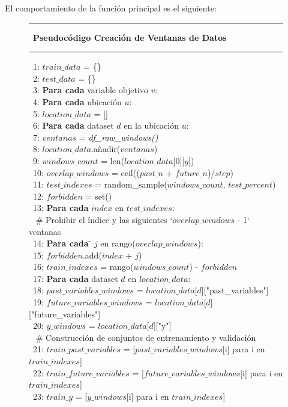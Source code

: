 \bigskip
El comportamiento de la función principal es el siguiente:

\begin{figure}[H]
{\small
 \hrule \
 {\bf\small Pseudocódigo Creación de Ventanas de Datos}
 \hrule
\begin{center}
\begin{tabbing}
\ 1: $train\_data$ = \{\} \\
\ 2: $test\_data$ = \{\} \\
\ 3: {\bf Par}\={\bf a cada} variable objetivo $v$: \\
\ 4: \> {\bf Par}\={\bf a cada} ubicación $u$:  \\
\ 5: \> $location\_data$ = [] \\
\ 6: \> \> {\bf Par}\={\bf a cada} dataset $d$ en la ubicación $u$:  \\
\ 7: \> \> \> $ventanas$ =  \textit{df\_raw\_windows()} \\
\ 8: \> \> \> $location\_data$.añadir($ventanas$) \\
\ 9: \> \> $windows\_count$ = len($location\_data$[0][$y$]) \\
\ 10: \> \> $overlap\_windows$ = ceil(($past\_n$ + $future\_n$)/$step$) \\
\ 11: \> \> $test\_indexes$ = random\_sample($windows\_count$, $test\_percent$) \\
\ 12: \> \> $forbidden$ = set() \\
\ 13: \> \> {\bf Par}\={\bf a cada} $index$ en $test\_indexes$: \\
\     \> \> \>   \# Prohibir el índice y las siguientes `$overlap\_windows$ - 1` ventanas \\
\ 14: \> \> \>   {\bf Par}\={\bf a cada} \= $j$ en rango($overlap\_windows$): \\
\ 15: \> \> \> \>     $forbidden$.add($index$ + $j$) \\
\ 16: \> \> $train\_indexes$ = rango($windows\_count$) - $forbidden$ \\

\ 17: \> \> {\bf Par}\={\bf a cada} dataset $d$ en $location\_data$: \\
\ 18: \> \> \> $past\_variables\_windows$ = $location\_data$[$d$]["past\_variables"] \\
\ 19: \> \> \> $future\_variables\_windows$ = $location\_data$[$d$]["future\_variables"] \\
\ 20: \> \> \> $y\_windows$ = $location\_data$[$d$]["y"] \\
\     \> \> \> \# Construcción de conjuntos de entrenamiento y validación \\
\ 21: \> \> \> $train\_past\_variables$ = [$past\_variables\_windows$[i] para i en $train\_indexes$] \\
\ 22: \> \> \> $train\_future\_variables$ = [$future\_variables\_windows$[i] para i en $train\_indexes$] \\
\ 23: \> \> \> $train\_y$ = [$y\_windows$[i] para i en $train\_indexes$] \\


\end{tabbing}
\end{center}}
\end{figure}
